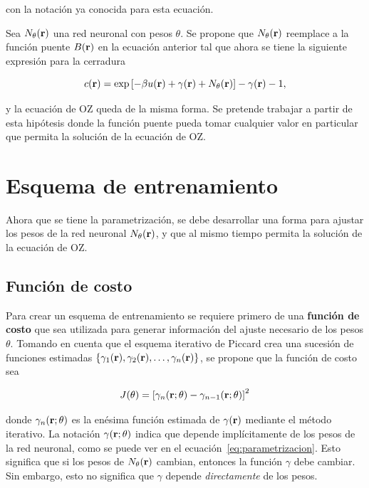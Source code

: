 con la notación ya conocida para esta ecuación.

Sea $N_{\theta}(\mathbf{r})$ una red neuronal con pesos $\theta$. Se propone que
$N_{\theta}(\mathbf{r})$ reemplace a la función puente $B(\mathbf{r})$ en la ecuación
anterior tal que ahora se tiene la siguiente expresión para la cerradura

\begin{equation}
    c(\mathbf{r}) = \exp{\left[
            -  \beta u(\mathbf{r})
            +  \gamma(\mathbf{r})
            + N_{\theta}(\mathbf{r})\right]} -
    \gamma(\mathbf{r})
    - 1 ,
    \label{eq:parametrizacion}
\end{equation}

y la ecuación de OZ queda de la misma forma.
Se pretende trabajar a partir de esta hipótesis donde la función puente
pueda tomar cualquier valor en particular que permita la solución de la
ecuación de OZ.


\section{Esquema de entrenamiento}
Ahora que se tiene la parametrización, se debe desarrollar una forma para ajustar los
pesos de la red neuronal $N_{\theta}(\mathbf{r})$, y que al mismo tiempo permita la solución
de la ecuación de OZ.

\subsection{Función de costo}
Para crear un esquema de entrenamiento se requiere primero de una \textbf{función de costo}
que sea utilizada para generar información del ajuste necesario de los pesos $\theta$.
Tomando en cuenta que el esquema iterativo de Piccard crea una sucesión de funciones
estimadas $\{\gamma_1(\mathbf{r}), \gamma_2(\mathbf{r}), \dots, \gamma_n(\mathbf{r})\}$, se propone que la función de costo
sea

\begin{equation}
    J(\theta) = \left[\gamma_{n}(\mathbf{r}; \theta) - \gamma_{n-1}(\mathbf{r}; \theta) \right]^2
    \label{eq:costo}
\end{equation}

donde $\gamma_{n}(\mathbf{r}; \theta)$ es la enésima función estimada de $\gamma(\mathbf{r})$
mediante el método iterativo. La notación $\gamma(\mathbf{r}; \theta)$ indica que depende
implícitamente de los pesos de la red neuronal, como se puede ver en el ecuación~\eqref{eq:parametrizacion}.
Esto significa que si los pesos de $N_{\theta}(\mathbf{r})$ cambian, entonces la función $\gamma$ debe cambiar.
Sin embargo, esto no significa que $\gamma$ depende \emph{directamente} de los pesos.

